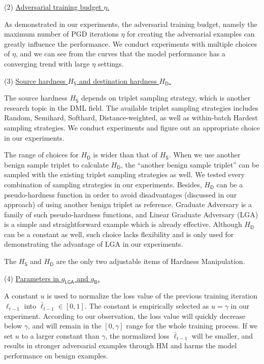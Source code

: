 (2) \ul{Adversarial training budget $\eta$.}

As demonstrated in our experiments, the adversarial training budget, namely the
maximum number of PGD iterations $\eta$ for creating the adversarial examples
can greatly influence the performance.
%
We conduct experiments with multiple choices of $\eta$, and we can see from the
curves that the model performance has a converging trend with large $\eta$
settings.

(3) \ul{Source hardness $H_\mathsf{S}$ and destination hardness
$H_\mathsf{D}$.}

The source hardness $H_\mathsf{S}$ depends on triplet sampling strategy, which
is another research topic in the DML field.
%
The available triplet sampling strategies includes Random, Semihard, Softhard,
Distance-weighted, as well as within-batch Hardest sampling strategies.
%
We conduct experiments and figure out an appropriate choice in our experiments.

The range of choices for $H_\mathsf{D}$ is wider than that of $H_\mathsf{S}$.
%
When we use another benign sample triplet to calculate $H_\mathsf{D}$, the
``another benign sample triplet'' can be sampled with the existing triplet
sampling strategies as well.
%
We tested every combination of sampling strategies in our experiments.
%
Besides, $H_\mathsf{D}$ can be a pseudo-hardness function in order to avoid
disadvantages (discussed in our approach) of using another benign triplet as
reference.
%
Graduate Adversary is a family of such pseudo-hardness functions, and Linear
Graduate Adversary (LGA) is a simple and straightforward example which is
already effective.
%
Although $H_\mathsf{D}$ can be a constant as well, such choice lacks
flexibility and is only used for demonstrating the advantage of LGA in our
experiments.

The $H_\mathsf{S}$ and $H_\mathsf{D}$ are the only two adjustable items of
Hardness Manipulation.

(4) \ul{Parameters in $g_\mathsf{LGA}$ and $g_\mathsf{B}$.}

A constant $u$ is used to normalize the loss value of the previous training
iteration $\ell_{t-1}$ into $\bar{\ell}_{t-1}\in[0,1]$.
%
The constant is empirically selected as $u=\gamma$ in our experiment.
%
According to our observation, the loss value will quickly decrease below
$\gamma$, and will remain in the $[0,\gamma]$ range for the whole training
process.
%
If we set $u$ to a larger constant than $\gamma$, the normalized loss
$\bar{\ell}_{t-1}$ will be smaller, and results in stronger adversarial
examples through HM and harms the model performance on benign examples.


